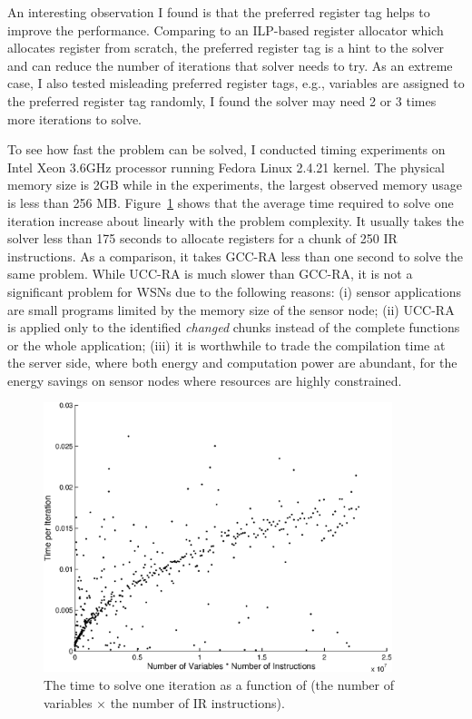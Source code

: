 An interesting observation I found is that the preferred register tag
helps to improve the performance. Comparing to an ILP-based register
allocator which allocates register from scratch, the preferred
register tag is a hint to the solver and can reduce the number of
iterations that solver needs to try.  As an extreme case, I also
tested misleading preferred register tags, e.g., variables are
assigned to the preferred register tag randomly, I found the solver
may need 2 or 3 times more iterations to solve.

To see how fast the problem can be solved, I conducted timing
experiments on Intel Xeon 3.6GHz processor running Fedora Linux 2.4.21
kernel. The physical memory size is 2GB while in the experiments, the
largest observed memory usage is less than 256
MB. Figure~\ref{fexp.time.con} shows that the average time required to
solve one iteration increase about linearly with the problem
complexity.  It usually takes the solver less than 175 seconds to
allocate registers for a chunk of 250 IR instructions. As a
comparison, it takes GCC-RA less than one second to solve the same
problem. While UCC-RA is much slower than GCC-RA, it is not a
significant problem for WSNs due to the following reasons: (i) sensor
applications are small programs limited by the memory size of the
sensor node; (ii) UCC-RA is applied only to the identified {\em
changed} chunks instead of the complete functions or the whole
application; (iii) it is worthwhile to trade the compilation time at
the server side, where both energy and computation power are abundant,
for the energy savings on sensor nodes where resources are highly
constrained.
\begin{figure}[htbp]
\centering
\includegraphics [width=4in]{figures/time_linear.eps}
\caption[The time to solve one iteration as a function of.]{The time to solve one iteration as a function of 
(the number of variables $\times$ the number of IR instructions).}
\label{fexp.time.con}
\end{figure}


